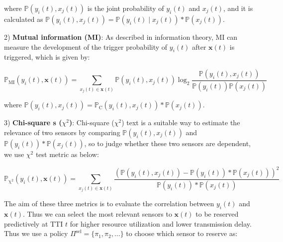 \documentclass{SCIS2021}
\begin{document}
	\vspace{-6pt}
	\noindent where $\mathbb{P}(y_{i}(t), x_{j}(t))$ is the joint probability of $y_{i}(t)$ and $x_{j}(t)$, and it is calculated as $\mathbb{P}(y_{i}(t), x_{j}(t)) = \mathbb{P}(y_{i}(t) \mid x_{j}(t)) * \mathbb{P}(x_{j}(t))$.
	
	\par 2) \textbf{Mutual information (MI)}: As described in information theory, MI can measure the development of the trigger probability of $y_{i}(t)$ after $\bm{x}(t)$ is triggered, which is given by:
	
	\setlength\abovedisplayskip{-15pt}
	\begin{center}
		\begin{equation}
			\mathbb{P}_{\mathrm{MI}}(y_{i}(t), \bm{x}(t))= \sum_{x_{j}(t)\in \bm{x}(t)} \mathbb{P}(y_{i}(t), x_{j}(t)) \log _{2} \frac{\mathbb{P}(y_{i}(t), x_{j}(t))}{\mathbb{P}(y_{i}(t)) \mathbb{P}(x_{j}(t))}
		\end{equation}
	\end{center}
	\setlength\belowdisplayskip{-8pt}
	
	\vspace{-6pt}
	\noindent where $\mathbb{P}(y_{i}(t), x_{j}(t)) = \mathbb{P}_{\mathrm{C}}(y_{i}(t), x_{j}(t)) * \mathbb{P}(x_{j}(t))$.
	
	\par 3) \textbf{Chi-square s ($\chi^{2}$)}: Chi-square ($\chi^{2}$) text is a suitable way to estimate the relevance of two sensors by comparing $\mathbb{P}(y_{i}(t), x_{j}(t))$ and $\mathbb{P}(y_{i}(t)) * \mathbb{P}(x_{j}(t))$, so to judge whether these two sensors are dependent, we use $\chi^{2}$ test metric as below:
	
	\setlength\abovedisplayskip{-16pt}
	\begin{center}
		\begin{equation}
			\mathbb{P}_{\mathrm{\chi^{2}}}(y_{i}(t), \bm{x}(t))= \sum_{x_{j}(t)\in \bm{x}(t)} \frac{(\mathbb{P}(y_{i}(t), x_{j}(t)) - \mathbb{P}(y_{i}(t)) * \mathbb{P}(x_{j}(t)))^{2}}{\mathbb{P}(y_{i}(t)) * \mathbb{P}(x_{j}(t))}
		\end{equation}
	\end{center}
	\setlength\belowdisplayskip{-8pt}
	
	
	\vspace{-6pt}
	\par The aim of these three metrics is to evaluate the correlation between $y_{i}(t)$ and $\bm{x}(t)$. Thus we can select the most relevant sensors to $\bm{x}(t)$ to be reserved predictively at TTI $t$ for higher resource utilization and lower transmission delay. Thus we use a policy $\Pi^\text{sel}=\{\pi_{1}, \pi_{2}, \dots\}$ to choose which sensor to reserve as:
	
\end{document}
